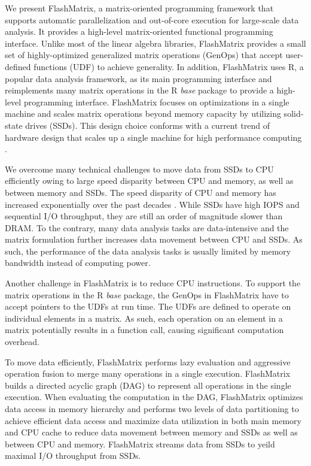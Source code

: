 
We present FlashMatrix, a matrix-oriented programming framework that supports
automatic parallelization and out-of-core execution for large-scale data analysis.
It provides a high-level matrix-oriented functional programming interface.
Unlike most of the linear algebra libraries, FlashMatrix provides a small
set of highly-optimized generalized matrix operations (GenOps) that accept
user-defined functions (UDF) to achieve generality. In addition, FlashMatrix
uses R, a popular data analysis framework, as its main programming interface
and reimplements many matrix operations in the R \textit{base} package to provide
a high-level programming interface. FlashMatrix focuses on optimizations in
a single machine and scales matrix operations beyond memory capacity by utilizing
solid-state drives (SSDs). This design choice conforms with a current trend of
hardware design that scales up a single machine for high performance computing
\cite{Ang14}.


We overcome many technical challenges to move data from SSDs to CPU efficiently
owing to large speed disparity between CPU and memory, as well as between memory and
SSDs. The speed disparity of CPU and memory has increased exponentially over
the past decades \cite{Wilkes01}. While SSDs have high IOPS and sequential
I/O throughput, they are still an order of magnitude slower than DRAM.
To the contrary, many data analysis tasks are data-intensive and the matrix
formulation further increases data movement between CPU and SSDs. As such,
the performance of the data analysis tasks is usually limited by memory
bandwidth instead of computing power.

Another challenge in FlashMatrix is to reduce CPU instructions. To support
the matrix operations in the R \textit{base} package, the GenOps in FlashMatrix
have to accept pointers to the UDFs at run time. The UDFs are defined to
operate on individual elements in a matrix. As such, each operation on an element
in a matrix potentially results in a function call, causing significant
computation overhead.

To move data efficiently, FlashMatrix performs lazy evaluation and aggressive
operation fusion to merge many operations in a single execution.
FlashMatrix builds a directed acyclic graph (DAG) to represent all operations
in the single execution. When evaluating the computation in the DAG, FlashMatrix
optimizes data access in memory hierarchy and performs two levels of data
partitioning to achieve efficient data access and maximize data utilization in
both main memory and CPU cache to reduce data movement between memory and SSDs
as well as between CPU and memory. FlashMatrix streams data from SSDs to yeild
maximal I/O throughput from SSDs.

